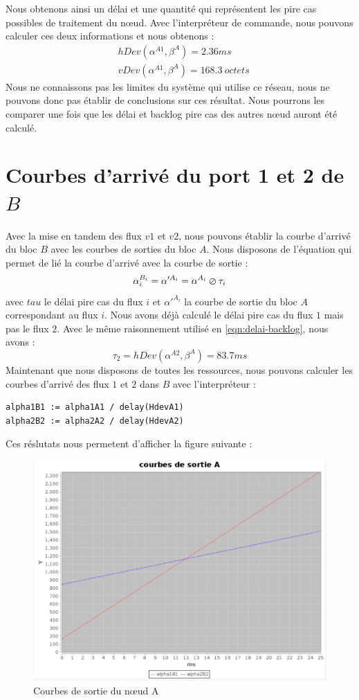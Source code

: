 Nous obtenons ainsi un délai et une quantité qui représentent les pire cas possibles de traitement du nœud. Avec l'interpréteur de commande, nous pouvons calculer ces deux informations et nous obtenons : \begin{align}\label{eqn:delai-backlog}
&hDev(\alpha^{A1},\beta^A) = 2.36 ms\\
&vDev(\alpha^{A1},\beta^A) = 168.3\ octets
\end{align}
Nous ne connaissons pas les limites du système qui utilise ce réseau, nous ne pouvons donc pas établir de conclusions sur ces résultat. Nous pourrons les comparer une fois que les délai et backlog pire cas des autres nœud auront été calculé.

\section{Courbes d'arrivé du port 1 et 2 de $B$}\label{sub:sortiesAs}
Avec la mise en tandem des flux $v1$ et $v2$, nous pouvons établir la courbe d'arrivé du bloc $B$ avec les courbes de sorties du bloc $A$. Nous disposons de l'équation qui permet de lié la courbe d'arrivé avec la courbe de sortie :
 \begin{equation}
\alpha_i^{B_i} = \alpha'^{A_i} = \alpha^{A_i} \varoslash \tau_i
\end{equation} avec $tau$ le délai pire cas du flux $i$ et $\alpha'^{A_i}$ la courbe de sortie du bloc $A$ correspondant au flux $i$. Nous avons déjà calculé le délai pire cas du flux $1$ mais pas le flux $2$. Avec le même raisonnement utilisé en \ref{eqn:delai-backlog}, nous avons :
\begin{equation}
\tau_2 = hDev(\alpha^{A2}, \beta^{A}) = 83.7ms
\end{equation}
Maintenant que nous disposons de toutes les ressources, nous pouvons calculer les courbes d'arrivé des flux $1$ et $2$ dans $B$ avec l'interpréteur : \begin{verbatim}
alpha1B1 := alpha1A1 / delay(HdevA1)
alpha2B2 := alpha2A2 / delay(HdevA2)
\end{verbatim}
Ces réslutats nous permetent d'afficher la figure suivante :
\begin{figure}[!ht]
\centering
\includegraphics[width = .6\textwidth]{./I/images/sortiesA.png}
\caption{\label{fig:sortieA}Courbes de sortie du nœud A}
\end{figure} 
